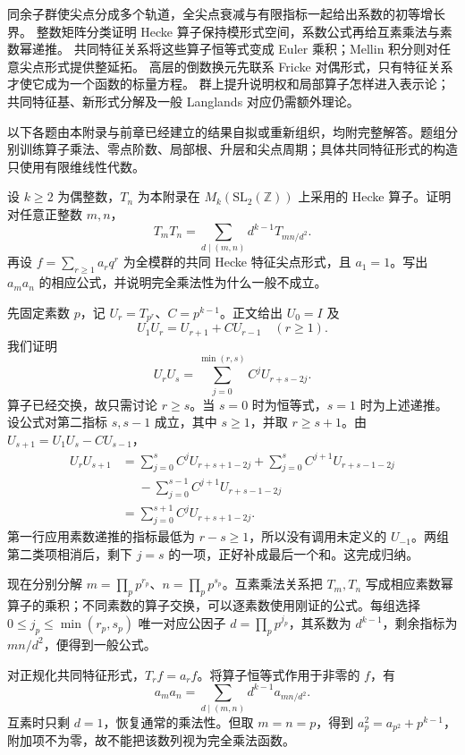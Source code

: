 \begin{chaptersummary}
同余子群使尖点分成多个轨道，全尖点衰减与有限指标一起给出系数的初等增长界。
整数矩阵分类证明 Hecke 算子保持模形式空间，系数公式再给互素乘法与素数幂递推。
共同特征关系将这些算子恒等式变成 Euler 乘积；Mellin 积分则对任意尖点形式提供整延拓。
高层的倒数换元先联系 Fricke 对偶形式，只有特征关系才使它成为一个函数的标量方程。
群上提升说明权和局部算子怎样进入表示论；共同特征基、新形式分解及一般 Langlands 对应仍需额外理论。
\end{chaptersummary}
\BookExercises

以下各题由本附录与前章已经建立的结果自拟或重新组织，均附完整解答。题组分别训练算子乘法、零点阶数、局部根、升层和尖点周期；具体共同特征形式的构造只使用有限维线性代数。

\begin{exercise}\label{b3:ex:E-1}
设 \(k\ge2\) 为偶整数，\(T_n\) 为本附录在 \(M_k(\mathrm{SL}_2(\mathbb Z))\) 上采用的 Hecke 算子。证明对任意正整数 \(m,n\)，
\[
 T_mT_n=\sum_{d\mid(m,n)}d^{k-1}T_{mn/d^2}.
\]
再设 \(f=\sum_{r\ge1}a_rq^r\) 为全模群的共同 Hecke 特征尖点形式，且 \(a_1=1\)。写出 \(a_ma_n\) 的相应公式，并说明完全乘法性为什么一般不成立。
\end{exercise}
\begin{solution}
先固定素数 \(p\)，记 \(U_r=T_{p^r}\)、\(C=p^{k-1}\)。正文给出 \(U_0=I\) 及
\[
 U_1U_r=U_{r+1}+CU_{r-1}\quad(r\ge1).
\]
我们证明
\[
 U_rU_s=\sum_{j=0}^{\min(r,s)}C^jU_{r+s-2j}.
\]
算子已经交换，故只需讨论 \(r\ge s\)。当 \(s=0\) 时为恒等式，\(s=1\) 时为上述递推。设公式对第二指标 \(s,s-1\) 成立，其中 \(s\ge1\)，并取 \(r\ge s+1\)。由 \(U_{s+1}=U_1U_s-CU_{s-1}\)，
\[
 \begin{aligned}
 U_rU_{s+1}
 &=\sum_{j=0}^s C^jU_{r+s+1-2j}
   +\sum_{j=0}^s C^{j+1}U_{r+s-1-2j}\\
 &\phantom{={}}-\sum_{j=0}^{s-1}C^{j+1}U_{r+s-1-2j}\\
 &=\sum_{j=0}^{s+1}C^jU_{r+s+1-2j}.
 \end{aligned}
\]
第一行应用素数递推的指标最低为 \(r-s\ge1\)，所以没有调用未定义的 \(U_{-1}\)。两组第二类项相消后，剩下 \(j=s\) 的一项，正好补成最后一个和。这完成归纳。

现在分别分解 \(m=\prod_pp^{r_p}\)、\(n=\prod_pp^{s_p}\)。互素乘法关系把 \(T_m,T_n\) 写成相应素数幂算子的乘积；不同素数的算子交换，可以逐素数使用刚证的公式。每组选择 \(0\le j_p\le\min(r_p,s_p)\) 唯一对应公因子 \(d=\prod_pp^{j_p}\)，其系数为 \(d^{k-1}\)，剩余指标为 \(mn/d^2\)，便得到一般公式。

对正规化共同特征形式，\(T_rf=a_rf\)。将算子恒等式作用于非零的 \(f\)，有
\[
 a_ma_n=\sum_{d\mid(m,n)}d^{k-1}a_{mn/d^2}.
\]
互素时只剩 \(d=1\)，恢复通常的乘法性。但取 \(m=n=p\)，得到
\(a_p^2=a_{p^2}+p^{k-1}\)，附加项不为零，故不能把该数列视为完全乘法函数。
\end{solution}

